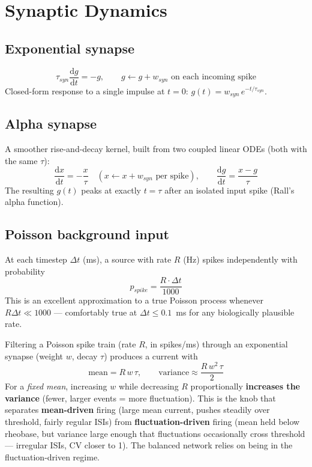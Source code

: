 \documentclass[11pt,a4paper]{article}
\newcommand{\dd}{\mathrm{d}}
\begin{document}
\section{Synaptic Dynamics}
\subsection{Exponential synapse}
\begin{eqbox}
$$\tau_{syn}\frac{\dd g}{\dd t} = -g, \qquad g \leftarrow g + w_{syn} \text{ on each incoming spike}$$
Closed-form response to a single impulse at $t=0$: $g(t) = w_{syn}\,e^{-t/\tau_{syn}}$.
\end{eqbox}

\subsection{Alpha synapse}
A smoother rise-and-decay kernel, built from two coupled linear ODEs (both with the same $\tau$):
$$\frac{\dd x}{\dd t} = -\frac{x}{\tau} \quad (x \leftarrow x + w_{syn}\text{ per spike}), \qquad \frac{\dd g}{\dd t} = \frac{x - g}{\tau}$$
The resulting $g(t)$ peaks at exactly $t=\tau$ after an isolated input spike (Rall's alpha function).

\subsection{Poisson background input}
\begin{defbox}
At each timestep $\Delta t$ (ms), a source with rate $R$ (Hz) spikes independently with probability
$$p_{spike} = \frac{R\cdot\Delta t}{1000}$$
This is an excellent approximation to a true Poisson process whenever $R\Delta t \ll 1000$ — comfortably true at $\Delta t \le 0.1$~ms for any biologically plausible rate.
\end{defbox}

\begin{keybox}
Filtering a Poisson spike train (rate $R$, in spikes/ms) through an exponential synapse (weight $w$, decay $\tau$) produces a current with
$$\text{mean} = R\,w\,\tau, \qquad \text{variance} \approx \frac{R\,w^2\,\tau}{2}$$
For a \emph{fixed mean}, increasing $w$ while decreasing $R$ proportionally \textbf{increases the variance} (fewer, larger events = more fluctuation). This is the knob that separates \textbf{mean-driven} firing (large mean current, pushes steadily over threshold, fairly regular ISIs) from \textbf{fluctuation-driven} firing (mean held below rheobase, but variance large enough that fluctuations occasionally cross threshold — irregular ISIs, CV closer to 1). The balanced network relies on being in the fluctuation-driven regime.
\end{keybox}
\end{document}
